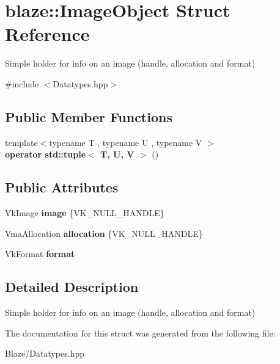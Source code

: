 \hypertarget{structblaze_1_1ImageObject}{}\section{blaze\+:\+:Image\+Object Struct Reference}
\label{structblaze_1_1ImageObject}


Simple holder for info on an image (handle, allocation and format)  




{\ttfamily \#include $<$Datatypes.\+hpp$>$}

\subsection*{Public Member Functions}
\begin{DoxyCompactItemize}
\item 
\mbox{\label{structblaze_1_1ImageObject_a3c848318d7baa260b9836eadc3dab31f}} 
{\footnotesize template$<$typename T , typename U , typename V $>$ }\\{\bfseries operator std\+::tuple$<$ T, U, V $>$} ()
\end{DoxyCompactItemize}
\subsection*{Public Attributes}
\begin{DoxyCompactItemize}
\item 
\mbox{\label{structblaze_1_1ImageObject_ad5aeb2ce0f734a8625d7481e5625c4ab}} 
Vk\+Image {\bfseries image} \{V\+K\+\_\+\+N\+U\+L\+L\+\_\+\+H\+A\+N\+D\+LE\}
\item 
\mbox{\label{structblaze_1_1ImageObject_ab524434b09dab1f5dc0d8c416d17a99d}} 
Vma\+Allocation {\bfseries allocation} \{V\+K\+\_\+\+N\+U\+L\+L\+\_\+\+H\+A\+N\+D\+LE\}
\item 
\mbox{\label{structblaze_1_1ImageObject_abd98b240a846082f7448248603f63816}} 
Vk\+Format {\bfseries format}
\end{DoxyCompactItemize}


\subsection{Detailed Description}
Simple holder for info on an image (handle, allocation and format) 

The documentation for this struct was generated from the following file\+:\begin{DoxyCompactItemize}
\item 
Blaze/Datatypes.\+hpp\end{DoxyCompactItemize}

